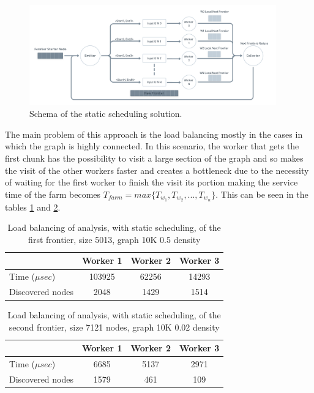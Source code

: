 \begin{figure}[htb!]
    \centering
    \includegraphics[width=0.95\textwidth]{Figures/par_schema.png}
    \caption{Schema of the static scheduling solution.}
    \label{fig:bfs_par_1_schema}
\end{figure}
\FloatBarrier

The main problem of this approach is the load balancing mostly in the cases in which the graph is highly connected. In this scenario, the worker that gets the first chunk has the possibility to visit a large section of the graph and so makes the visit of the other workers faster and creates a bottleneck due to the necessity of waiting for the first worker to finish the visit its portion making the service time of the farm becomes $T_{farm} = max\{T_{w_1}, T_{w_2}, ..., T_{w_n}\}$.  
This can be seen in the tables \ref{table:sched_st1} and \ref{table:sched_st2}.


\begin{table}[htb!]
\centering
\begin{tabular}{l|c|c|c|}
\cline{2-4}
\multicolumn{1}{c|}{}                  & Worker 1 & Worker 2 & Worker 3 \\ \hline
\multicolumn{1}{|l|}{Time ($\mu sec$)}             & 103925    & 62256    & 14293     \\ \hline
\multicolumn{1}{|l|}{Discovered nodes} & 2048     & 1429     & 1514     \\ \hline
\end{tabular}
\caption{Load balancing of analysis, with static scheduling, of the first frontier, size 5013, graph 10K 0.5 density}
\label{table:sched_st1}
\end{table}


\begin{table}[htb!]
\centering
\begin{tabular}{l|c|c|c|}
\cline{2-4}
\multicolumn{1}{c|}{}                  & Worker 1 & Worker 2 & Worker 3 \\ \hline
\multicolumn{1}{|l|}{Time ($\mu sec$)}             & 6685    & 5137    & 2971     \\ \hline
\multicolumn{1}{|l|}{Discovered nodes} & 1579     & 461     & 109     \\ \hline
\end{tabular}
\caption{Load balancing of analysis, with static scheduling, of the second frontier, size 7121 nodes, graph 10K 0.02 density}
\label{table:sched_st2}
\end{table}
\FloatBarrier

